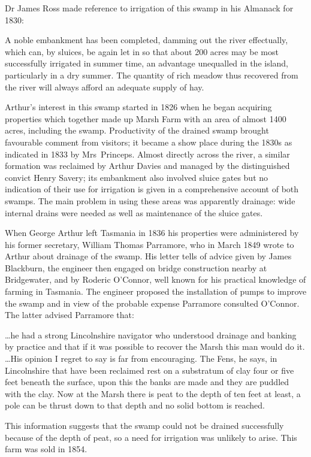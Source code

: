 Dr James Ross  made reference to irrigation of this
swamp in his Almanack for 1830:
\begin{Quote}
	A noble embankment has been completed, damming out the river
        effectually, which can, by sluices, be again let in so that
        about 200 acres may be most successfully irrigated in summer
        time, an advantage unequalled in the island, particularly in a
        dry summer. The quantity of rich meadow thus recovered from
        the river will always afford an adequate supply of
        hay.
\end{Quote}

Arthur's interest in this swamp started in 1826 when he began
acquiring properties which together made up Marsh Farm with an area of
almost 1400\,acres, including the swamp.  Productivity of the drained
swamp brought favourable comment from visitors; it became a show place
during the 1830s as indicated in 1833 by Mrs~Princeps.  Almost
directly across the river, a similar formation was reclaimed by Arthur
Davies and managed by the distinguished convict
Henry Savery; its embankment also involved sluice
gates but no indication of their use for irrigation is given in a
comprehensive account of both swamps.  The main problem in using these
areas was apparently drainage: wide internal drains were needed as
well as maintenance of the sluice gates.

When George Arthur left Tasmania in 1836 his properties were
administered by his former secretary, William Thomas
Parramore, who in March 1849 wrote to Arthur
about drainage of the swamp.  His letter tells of advice given by
James Blackburn, the engineer then engaged on
bridge construction nearby at Bridgewater, and by Roderic
O'Connor,  well known for his practical knowledge
of farming in Tasmania.  The engineer proposed the installation of
pumps to improve the swamp and in view of the probable expense
Parramore consulted O'Connor.  The latter advised Parramore that:
\begin{Quote}
	\ldots he had a strong Lincolnshire navigator who understood
	drain\-age and banking by practice and that if it was possible
	to recover the Marsh this man would do it. \ldots His opinion
	I regret to say is far from encouraging.  The Fens, he says,
	in Lincolnshire that have been reclaimed rest on a substratum
	of clay four or five feet beneath the surface, upon this the
	banks are made and they are puddled with the clay.  Now at the
	Marsh there is peat to the depth of ten feet at least, a pole
	can be thrust down to that depth and no solid bottom is
	reached.
\end{Quote}
This information suggests that the swamp could not be drained
successfully because of the depth of peat, so a need for irrigation
was unlikely to arise.  This farm was sold in 1854.

